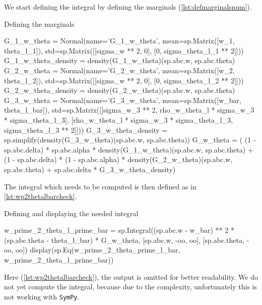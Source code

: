 We start defining the integral by defining the marginals (\cref{lst:defmarginalsnum}).
\begin{listing}[!ht]
    \caption{Defining the marginals}
    \label{lst:defmarginalsnum}
    \begin{pythoncode}
        G_1_w_theta = Normal(name='G_1_w_theta', mean=sp.Matrix([w_1, theta_l_1]),
            std=sp.Matrix([[sigma_w ** 2, 0], [0, sigma_theta_l_1 ** 2]]))
        G_1_w_theta_density = density(G_1_w_theta)(sp.abc.w, sp.abc.theta)
        G_2_w_theta = Normal(name='G_2_w_theta', mean=sp.Matrix([w_2, theta_l_2]),
            std=sp.Matrix([[sigma_w ** 2, 0], [0, sigma_theta_l_2 ** 2]]))
        G_2_w_theta_density = density(G_2_w_theta)(sp.abc.w, sp.abc.theta)
        G_3_w_theta = Normal(name='G_3_w_theta', mean=sp.Matrix([w_bar, theta_l_bar]),
            std=sp.Matrix([[sigma_w_3 ** 2,
                rho_w_theta_l * sigma_w_3 * sigma_theta_l_3],
                [rho_w_theta_l * sigma_w_3 * sigma_theta_l_3,
                sigma_theta_l_3 ** 2]]))
        G_3_w_theta_density = sp.simplify(density(G_3_w_theta)(sp.abc.w, sp.abc.theta))
        G_w_theta = (
        (1 - sp.abc.delta) * sp.abc.alpha * density(G_1_w_theta)(sp.abc.w, sp.abc.theta)
        + (1 - sp.abc.delta) * (1 - sp.abc.alpha) * density(G_2_w_theta)(sp.abc.w, sp.abc.theta)
        + sp.abc.delta * G_3_w_theta_density)
    \end{pythoncode}
\end{listing}

The integral which needs to be computed is then defined as in \cref{lst:wp2thetalbarcheck}.
\begin{listing}[!ht]
    \caption{Defining and displaying the needed integral}
    \label{lst:wp2thetalbarcheck}
    \begin{pythoncode}
        w_prime_2_theta_l_prime_bar = sp.Integral((sp.abc.w - w_bar) ** 2 *
            (sp.abc.theta - theta_l_bar) * G_w_theta,
            [sp.abc.w, -oo, oo], [sp.abc.theta, -oo, oo])
        display(sp.Eq(w_prime_2_theta_prime_l_bar, w_prime_2_theta_l_prime_bar))
    \end{pythoncode}
\end{listing}

Here (\cref{lst:wp2thetalbarcheck}), the output is omitted for better readability.
We do not yet compute the integral,
because due to the complexity,
unfortunately this is not working with \texttt{SymPy}.

